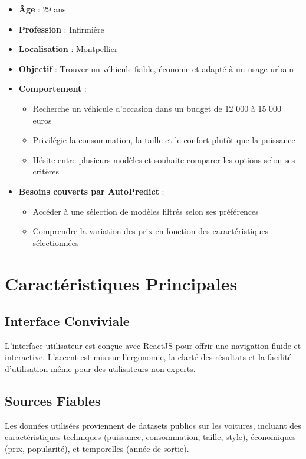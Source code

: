 \documentclass[12pt]{report}
\begin{document}
\begin{itemize}
    \item \textbf{Âge} : 29 ans
    \item \textbf{Profession} : Infirmière
    \item \textbf{Localisation} : Montpellier
    \item \textbf{Objectif} : Trouver un véhicule fiable, économe et adapté à un usage urbain
    \item \textbf{Comportement} :
    \begin{itemize}
        \item Recherche un véhicule d’occasion dans un budget de 12 000 à 15 000 euros
        \item Privilégie la consommation, la taille et le confort plutôt que la puissance
        \item Hésite entre plusieurs modèles et souhaite comparer les options selon ses critères
    \end{itemize}
    \item \textbf{Besoins couverts par AutoPredict} :
    \begin{itemize}
        \item Accéder à une sélection de modèles filtrés selon ses préférences
        \item Comprendre la variation des prix en fonction des caractéristiques sélectionnées
    \end{itemize}
\end{itemize}

\chapter{Caractéristiques Principales}
\section{Interface Conviviale}
L’interface utilisateur est conçue avec ReactJS pour offrir une navigation fluide et interactive.
L’accent est mis sur l’ergonomie, la clarté des résultats et la facilité d’utilisation même pour des utilisateurs non-experts.


\section{Sources Fiables}
Les données utilisées proviennent de datasets publics sur les voitures, incluant des caractéristiques techniques (puissance, consommation, taille, style), économiques (prix, popularité), et temporelles (année de sortie).
\end{document}
